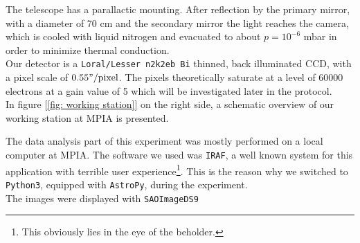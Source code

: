 The telescope has a parallactic mounting. After reflection by the primary mirror, with a diameter of 70 cm and the secondary mirror the light reaches the camera, which is cooled with liquid nitrogen and evacuated to about $p = 10^{-6}$ mbar in order to minimize thermal conduction.  \\
Our detector is a \texttt{Loral/Lesser n2k2eb Bi} thinned, back illuminated CCD, with a pixel scale of $0.55"/\text{pixel}$. The pixels theoretically saturate at a level of 60000 electrons at a gain value of 5 which will be investigated later in the protocol.\\
In figure [\ref{fig: working station}] on the right side, a schematic overview of our working station at MPIA is presented.

The data analysis part of this experiment was mostly performed on a local computer at MPIA. 
The software we used was \texttt{IRAF}, a well known system for this application with terrible user experience\footnote{This obviously lies in the eye of the beholder.}. This is the reason why we switched to \texttt{Python3}, equipped with \texttt{AstroPy}, during the experiment. \\
The images were displayed with \texttt{SAOImageDS9}